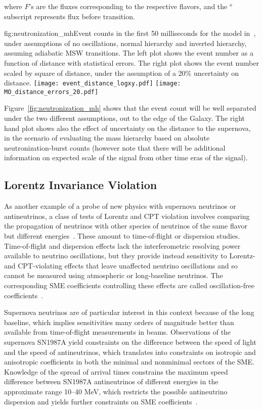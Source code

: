 where $F$'s are the fluxes corresponding to the respective flavors,
and the $^o$ subscript represents flux before transition.

\begin{dunefigure}[MH1]{fig:neutronization_mh}{Event counts in the
    first 50 milliseconds for the model in~\cite{Huedepohl}, under
    assumptions of no oscillations, normal hierarchy and inverted
    hierarchy, assuming adiabatic MSW transitions.  The left plot
    shows the event number as a function of distance with statistical
    errors.  The right plot
    shows the event number scaled by square of distance, under the
    assumption of a 20\% uncertainty on distance. }
\texttt{[image: event\_distance\_logxy.pdf]}
\texttt{[image: MO\_distance\_errors\_20.pdf]}
\end{dunefigure}

Figure~\ref{fig:neutronization_mh} shows that the event count will be
well separated under the two different assumptions, out to the edge of
the Galaxy.  The right hand plot shows also the effect of uncertainty
on the distance to the supernova, in the scenario of evaluating the
mass hierarchy based on absolute neutronization-burst counts (however
note that there will be additional information on expected scale of
the signal from other time eras of the signal).


\subsection{Lorentz Invariance Violation}

As another example of a probe of new physics with supernova neutrinos or antineutrinos,
a class of tests of Lorentz and CPT violation involves comparing the propagation of neutrinos with other species of neutrinos of the same flavor but different energies~\cite{Kostelecky:2003cr,Kostelecky:2003xn,Kostelecky:2011gq,Diaz:2009qk}. These amount to time-of-flight or dispersion studies.
Time-of-flight and dispersion effects lack the interferometric resolving power available to neutrino oscillations, but they provide instead sensitivity to Lorentz- and CPT-violating effects that  leave unaffected neutrino oscillations
and so cannot be measured using atmospheric or long-baseline neutrinos.
The corresponding SME coefficients controlling these effects are called oscillation-free coefficients~\cite{Kostelecky:2011gq}.

Supernova neutrinos are of particular interest in this context because of the long baseline, which implies sensitivities many orders of magnitude better than available from time-of-flight measurements in beams. Observations of the supernova SN1987A yield constraints on the difference between the speed of light and the speed of antineutrinos, which translates into constraints on isotropic and anisotropic coefficients in both the minimal and nonminimal sectors of the SME. Knowledge of the spread of arrival times constrains the maximum speed difference between SN1987A antineutrinos of different energies in the approximate range 10--40 MeV, which restricts the possible antineutrino dispersion and yields further constraints on SME coefficients~\cite{Kostelecky:2011gq}.

